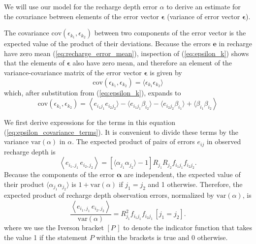 \documentclass[11pt,a4paper]{article}
\renewcommand{\vec}[1]{\mathbf{#1}}
\begin{document}
We will use our model for the recharge depth error $\alpha$ to derive
an estimate for the covariance between elements of the error vector
$\bm{\epsilon}$ (variance of error vector $\bm{\epsilon}$).

The covariance $\text{cov}(\epsilon_{k_1}, \epsilon_{k_2})$
between two components of the error vector is the expected value of
the product of their deviations.  Because the errors $\vec{e}$ in
recharge have zero mean (\ref{eq:recharge_error_mean}), inspection of
(\ref{eq:epsilon_k}) shows that the elements of $\bm{\epsilon}$ also
have zero mean, and therefore an element of the variance-covariance
matrix of the error vector $\bm\epsilon$ is given by
\begin{equation}
  \label{eq:epsilon_covariance}
  \text{cov}\left(\epsilon_{k_1}, \epsilon_{k_2}\right) = \langle \epsilon_{k_1} \epsilon_{k_2}\rangle
\end{equation}
which, after substitution from (\ref{eq:epsilon_k}), expands to
\begin{equation}
  \label{eq:epsilon_covariance_terms}
  \text{cov}\left(\epsilon_{k_1}, \epsilon_{k_2}\right) = \left\langle e_{i_1 j_1} e_{i_2 j_2}\rangle - \langle e_{i_1 j_1}\beta_{i_2}\rangle - \langle e_{i_2 j_2}\beta_{i_1}\rangle + \langle \beta_{i_1}\beta_{i_2} \right\rangle
\end{equation}

We first derive expressions for the terms in this equation
(\ref{eq:epsilon_covariance_terms}).  It is convenient to divide these
terms by the variance $\text{var}(\alpha)$ in $\alpha$.  The expected
product of pairs of errors $e_{ij}$ in observed recharge depth is
\begin{equation}
  \left\langle e_{i_1, j_1}\, e_{i_2, j_2}\right\rangle = \left[ \langle\alpha_{j_1} \alpha_{j_2}\rangle - 1 \right] R_{j_1} R_{j_2} f_{i_1 j_1} f_{i_2 j_2}.
\end{equation}
Because the components of the error $\bm{\alpha}$ are independent, the
expected value of their product
$\langle\alpha_{j_1} \alpha_{j_2}\rangle$ is $1 + \text{var}(\alpha)$
if $j_1 = j_2$ and 1 otherwise.  Therefore, the expected product of
recharge depth observation errors, normalized by $\text{var}(\alpha)$,
is
\begin{equation}
  \label{eq:e_covariance}
  \frac{\left\langle e_{i_1, j_1}\, e_{i_2, j_2}\right\rangle}
       {\text{var}(\alpha)} =
    R_{j_1}^2 f_{i_1 j_1} f_{i_2 j_1}\, [j_1 = j_2].
\end{equation}
where we use the Iverson bracket $[P\,]$ to denote the indicator
function that takes the value 1 if the statement $P$ within the
brackets is true and 0 otherwise.
\end{document}
